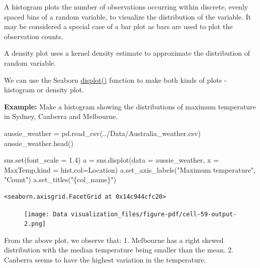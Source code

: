 \documentclass[
  letterpaper,
  DIV=11,
  numbers=noendperiod]{scrreprt}
\newenvironment{Shaded}{\begin{snugshade}}{\end{snugshade}}
\newcommand{\BuiltInTok}[1]{\textcolor[rgb]{0.00,0.23,0.31}{#1}}
\newcommand{\FloatTok}[1]{\textcolor[rgb]{0.68,0.00,0.00}{#1}}
\newcommand{\NormalTok}[1]{\textcolor[rgb]{0.00,0.23,0.31}{#1}}
\newcommand{\OperatorTok}[1]{\textcolor[rgb]{0.37,0.37,0.37}{#1}}
\newcommand{\SpecialCharTok}[1]{\textcolor[rgb]{0.37,0.37,0.37}{#1}}
\newcommand{\StringTok}[1]{\textcolor[rgb]{0.13,0.47,0.30}{#1}}
\begin{document}
A histogram plots the number of observations occurring within discrete,
evenly spaced bins of a random variable, to visualize the distribution
of the variable. It may be considered a special case of a bar plot as
bars are used to plot the observation counts.

A density plot uses a kernel density estimate to approximate the
distribution of random variable.

We can use the Seaborn
\href{https://seaborn.pydata.org/generated/seaborn.histplot.html}{displot()}
function to make both kinds of plots - histogram or density plot.

\textbf{Example:} Make a histogram showing the distributions of maximum
temperature in Sydney, Canberra and Melbourne.

\begin{Shaded}
\begin{Highlighting}[]
\NormalTok{aussie\_weather }\OperatorTok{=}\NormalTok{ pd.read\_csv(}\StringTok{\textquotesingle{}../Data/Australia\_weather.csv\textquotesingle{}}\NormalTok{)}
\NormalTok{aussie\_weather.head()}

\NormalTok{sns.}\BuiltInTok{set}\NormalTok{(font\_scale }\OperatorTok{=} \FloatTok{1.4}\NormalTok{)}
\NormalTok{a }\OperatorTok{=}\NormalTok{ sns.displot(data }\OperatorTok{=}\NormalTok{ aussie\_weather, x }\OperatorTok{=} \StringTok{\textquotesingle{}MaxTemp\textquotesingle{}}\NormalTok{,kind }\OperatorTok{=} \StringTok{\textquotesingle{}hist\textquotesingle{}}\NormalTok{,col}\OperatorTok{=}\StringTok{\textquotesingle{}Location\textquotesingle{}}\NormalTok{)}
\NormalTok{a.set\_axis\_labels(}\StringTok{"Maximum temperature"}\NormalTok{, }\StringTok{"Count"}\NormalTok{)}
\NormalTok{a.set\_titles(}\StringTok{"}\SpecialCharTok{\{col\_name\}}\StringTok{"}\NormalTok{)}
\end{Highlighting}
\end{Shaded}

\begin{verbatim}
<seaborn.axisgrid.FacetGrid at 0x14c944cfc20>
\end{verbatim}

\begin{figure}[H]

{\centering \texttt{[image: Data visualization\_files/figure-pdf/cell-59-output-2.png]}

}

\end{figure}

From the above plot, we observe that: 1. Melbourne has a right skewed
distribution with the median temperature being smaller than the mean. 2.
Canberra seems to have the highest variation in the temperature.
\end{document}
